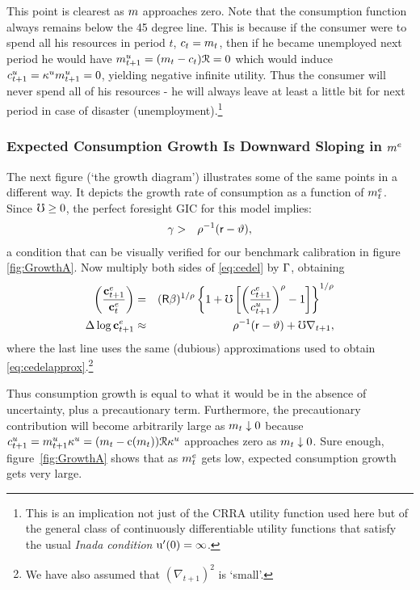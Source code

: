 \message{ !name(TractableBufferStock.tex)}\documentclass{handout}
\begin{document}
This point is clearest as $m$ approaches zero.  Note that the
consumption function always remains below the 45 degree line.  This
is because if the consumer were to spend all his resources in
period $t$, $c_{t}=m_{t}$, then if he became unemployed next
period he would have ${m}^{u}_{t+1}=(m_{t}-c_{t})\mathcal{R}=0$ which
would induce $c^{u}_{t+1}= \kappa^{u} {m}^{u}_{t+1}=0$, yielding negative
infinite utility.  Thus the consumer will never spend all of his
resources - he will always leave at least a little bit for next period
in case of disaster (unemployment).\footnote{This is an implication not just
of the CRRA utility function used here but of the general class of continuously differentiable utility
functions that satisfy the usual {\it Inada condition} ${\mathrm{u}}^{\prime}(0) = \infty$.}

\subsubsection{Expected Consumption Growth Is Downward Sloping in $m^{e}$}
The next figure (`the growth diagram') illustrates some of the same points in a different
way.  It depicts the growth rate of consumption as a function of $m^{e}_{t}$.
Since $\mho \geq 0$, the perfect foresight GIC for this model
implies:
\begin{eqnarray}
  \gamma & > & \rho^{-1}(\mathsf{r}-\vartheta) ,
\end{eqnarray}
a condition that can be visually verified for our benchmark calibration in figure \ref{fig:GrowthA}.  Now multiply both sides of \eqref{eq:cedel} by $\Gamma$, obtaining
\begin{eqnarray}
        \left(\frac{\mathbf{c}^{e}_{t+1}}{\mathbf{c}^{e}_{t}}\right) & = & (\mathsf{R}\beta)^{1/\rho} \left\{1+\mho\left[\left(\frac{c^{e}_{t+1}}{c^{u}_{t+1}}\right)^{\rho}-1\right]\right\}^{1/\rho} \label{eq:cLevGro}
\\       \Delta \log \mathbf{c}^{e}_{t+1} & \approx & \rho^{-1}(\mathsf{r}-\vartheta) +  \mho \nabla _{t+1}, \label{eq:cLevGroLogUtil}
\end{eqnarray}
where the last line uses the same (dubious) approximations used to obtain
\eqref{eq:cedelapprox}.\footnote{We have also assumed that $(\nabla _{t+1})^{2}$ is `small'.}

Thus consumption growth is equal to what it would be in the absence of
uncertainty, plus a precautionary term.  Furthermore, 
the precautionary contribution will become arbitrarily large as $m_{t}
\downarrow 0$ because $c^{u}_{t+1} = {m}^{u}_{t+1}\kappa^{u}  =
(m_{t}-\mathrm{c}(m_{t}))\mathcal{R}\kappa^{u}$ approaches zero as $m_{t} \downarrow 0$.  Sure
enough, figure~\ref{fig:GrowthA} shows that as $m^{e}_{t}$
gets low, expected consumption growth gets very large.
\end{document}
